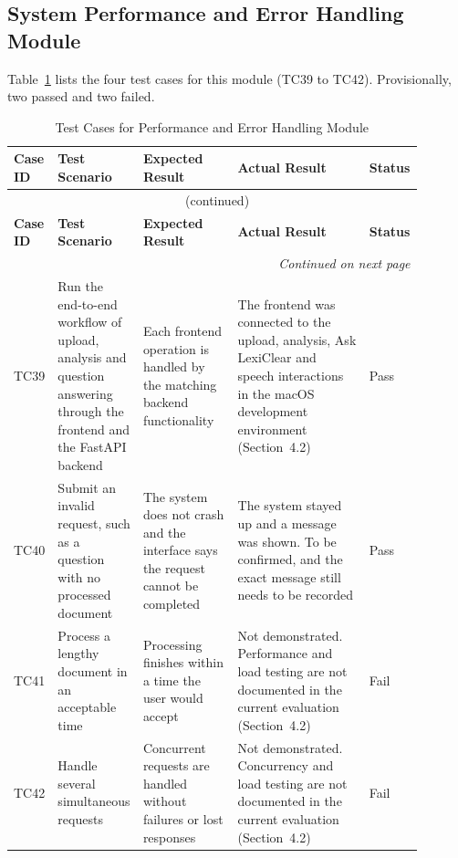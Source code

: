 \documentclass[12pt,a4paper,oneside]{report}
\begin{document}
\subsection{System Performance and Error Handling Module}
Table~\ref{tab:perf} lists the four test cases for this module (TC39 to TC42). Provisionally, two passed and two failed.
{\footnotesize
\setlength{\tabcolsep}{3pt}
\renewcommand{\arraystretch}{1.15}
\begin{longtable}{|p{0.075\linewidth}|p{0.19\linewidth}|p{0.23\linewidth}|p{0.32\linewidth}|p{0.08\linewidth}|}
\caption{Test Cases for Performance and Error Handling Module}\label{tab:perf}\\
\hline
\textbf{Case ID} & \textbf{Test Scenario} & \textbf{Expected Result} & \textbf{Actual Result} & \textbf{Status}\\
\hline
\endfirsthead
\multicolumn{5}{c}{\tablename~\thetable{} (continued)}\\
\hline
\textbf{Case ID} & \textbf{Test Scenario} & \textbf{Expected Result} & \textbf{Actual Result} & \textbf{Status}\\
\hline
\endhead
\hline
\multicolumn{5}{r}{\emph{Continued on next page}}\\
\endfoot
\hline
\endlastfoot
TC39 & Run the end-to-end workflow of upload, analysis and question answering through the frontend and the FastAPI backend & Each frontend operation is handled by the matching backend functionality & The frontend was connected to the upload, analysis, Ask LexiClear and speech interactions in the macOS development environment (Section~4.2) & Pass\\
\hline
TC40 & Submit an invalid request, such as a question with no processed document & The system does not crash and the interface says the request cannot be completed & The system stayed up and a message was shown. To be confirmed, and the exact message still needs to be recorded & Pass\\
\hline
TC41 & Process a lengthy document in an acceptable time & Processing finishes within a time the user would accept & Not demonstrated. Performance and load testing are not documented in the current evaluation (Section~4.2) & Fail\\
\hline
TC42 & Handle several simultaneous requests & Concurrent requests are handled without failures or lost responses & Not demonstrated. Concurrency and load testing are not documented in the current evaluation (Section~4.2) & Fail\\
\end{longtable}
}
\end{document}
